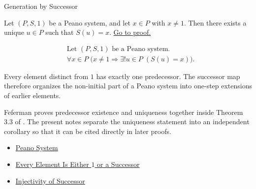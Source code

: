 \begin{topicbox}{Generation by Successor}
\begin{tcolorbox}[colback=corbox, colframe=corborder, arc=2pt,
  left=6pt, right=6pt, top=4pt, bottom=4pt,
  title={\small\textbf{Corollary (Predecessor Existence and Uniqueness Away from \texorpdfstring{$1$}{1})}} ,
  fonttitle=\small\bfseries]
\begin{corollary}
\label{cor:predecessor-exists-unique-away-from-one}
Let $(P,S,1)$ be a Peano system, and let $x \in P$ with $x \neq 1$. Then
there exists a unique $u \in P$ such that $S(u)=x$.
\hyperref[prf:predecessor-exists-unique-away-from-one]{Go to proof.}
\end{corollary}
\end{tcolorbox}

\begin{remark*}
\[
\begin{aligned}
&\text{Let } (P,S,1) \text{ be a Peano system.}\\
&\forall x \in P\;\bigl(x \neq 1 \Longrightarrow \exists! u \in P\;(S(u)=x)\bigr).
\end{aligned}
\]
\end{remark*}

\begin{remark*}[Interpretation]
Every element distinct from $1$ has exactly one predecessor. The successor map
therefore organizes the non-initial part of a Peano system into one-step
extensions of earlier elements.
\end{remark*}

\begin{remark*}
Feferman proves predecessor existence and uniqueness together inside Theorem
3.3 of \citet{FefermanNumberSystems1964}. The present notes separate the
uniqueness statement into an independent corollary so that it can be cited
directly in later proofs.
\end{remark*}

\begin{remark*}[Dependencies]
\begin{itemize}
  \item \hyperref[def:peano-system]{Peano System}
  \item \hyperref[thm:every-element-is-one-or-a-successor]{Every Element Is Either $1$ or a Successor}
  \item \hyperref[ax:peano-successor-injective]{Injectivity of Successor}
\end{itemize}
\end{remark*}


\end{topicbox}
